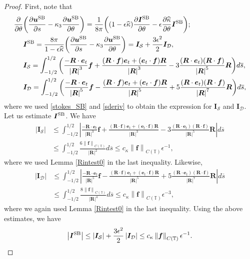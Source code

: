 \documentclass[11pt]{article}
\numberwithin{equation}{section}
\newcommand{\T}{\mathbb{T}}
\newcommand{\bars}{\overline s}
\newcommand{\bu}{\bm{u}}
\newcommand{\be}{\bm{e}}
\newcommand{\p}{\partial}
\newcommand{\SB}{{\rm SB}}
\newcommand{\abs}[1]{\left\lvert #1 \right\rvert}
\newcommand{\norm}[1]{\left\lVert #1 \right\rVert}
\newcommand{\wh}[1]{\widehat{#1}}
\newcommand{\mc}[1]{\mathcal{#1}}
\theoremstyle{definition}
\begin{document}
\begin{proof}
First, note that 
\begin{equation}\label{uSBstheta}
\begin{split}
\frac{\p}{\p\theta}&\bigg(\frac{\p\bu^{\SB}}{\p s}-\kappa_3\frac{\p\bu^{\SB}}{\p\theta}\bigg) = \frac{1}{8\pi}\bigg((1-\epsilon\wh\kappa)\frac{\p \bm{I}^{\SB}}{\p \theta} - \epsilon\frac{\p \wh{\kappa}}{\p \theta}\bm{I}^{\SB} \bigg);\\
&\bm{I}^{\SB}=\frac{8\pi}{1-\epsilon\wh{\kappa}}\bigg(\frac{\p \bu^{\SB}}{\p s} -\kappa_3\frac{\p\bu^{\SB}}{\p \theta}\bigg) = \bm{I}_{\mc{S}}+\frac{3\epsilon^2}{2}\bm{I}_{\mc{D}},\\
&\bm{I}_{\mc{S}}=\int_{-1/2}^{1/2}\bigg(\frac{-\bm{R}\cdot\be_t}{\abs{\bm{R}}^3}\bm{f} + \frac{(\bm{R}\cdot \bm{f})\be_t +(\be_t\cdot \bm{f})\bm{R}}{\abs{\bm{R}}^3} - 3\frac{(\bm{R}\cdot\be_t)(\bm{R}\cdot\bm{f})}{\abs{\bm{R}}^5}\bm{R} \bigg)d\bars,\\
&\bm{I}_{\mc{D}}= \int_{-1/2}^{1/2}\bigg(\frac{-\bm{R}\cdot\be_t}{\abs{\bm{R}}^5}\bm{f} -\frac{(\bm{R}\cdot \bm{f})\be_t +(\be_t\cdot \bm{f})\bm{R}}{\abs{\bm{R}}^5} +5\frac{(\bm{R}\cdot\be_t)(\bm{R}\cdot\bm{f})}{\abs{\bm{R}}^7}\bm{R} \bigg)d\bars,
\end{split}
\end{equation}
where we used \eqref{stokes_SB} and \eqref{sderiv} to obtain the expression for $\bm{I}_{\mc S}$ and $\bm{I}_{\mc D}$.\\

Let us estimate $\bm{I}^{\SB}$. We have
\begin{align*}
\abs{\bm{I}_{\mc{S}}} &\le \int_{-1/2}^{1/2}\abs{\frac{-\bm{R}\cdot\be_t}{\abs{\bm{R}}^3}\bm{f} +\frac{(\bm{R}\cdot \bm{f})\be_t+(\be_t\cdot \bm{f})\bm{R}}{\abs{\bm{R}}^3} - 3\frac{(\bm{R}\cdot\be_t)(\bm{R}\cdot\bm{f})}{\abs{\bm{R}}^5}\bm{R}} d\bars \\
&\le \int_{-1/2}^{1/2} \frac{6\norm{\bm{f}}_{C(\T)}}{\abs{\bm{R}}^2}d\bars
\le c_\kappa \norm{\bm{f}}_{C(\T)}\epsilon^{-1},
\end{align*}
where we used Lemma \ref{Rintest0} in the last inequality. Likewise,
\begin{align*}
\abs{\bm{I}_{\mc{D}}} &\le \int_{-1/2}^{1/2}\abs{\frac{-\bm{R}\cdot\be_t}{\abs{\bm{R}}^5}\bm{f} -\frac{(\bm{R}\cdot \bm{f})\be_t +(\be_t\cdot \bm{f})\bm{R}}{\abs{\bm{R}}^5} +5\frac{(\bm{R}\cdot\be_t)(\bm{R}\cdot\bm{f})}{\abs{\bm{R}}^7}\bm{R}} d\bars \\
&\le \int_{-1/2}^{1/2} \frac{8\norm{\bm{f}}_{C(\T)}}{\abs{\bm{R}}^4}d\bars \le c_\kappa \norm{\bm{f}}_{C(\T)}\epsilon^{-3},
\end{align*}
where we again used Lemma \ref{Rintest0} in the last inequality. Using the above estimates, we have
\begin{equation}\label{CI}
\abs{\bm{I}^{\SB}} \le \abs{\bm{I}_{\mc S}}+\frac{3\epsilon^2}{2}\abs{\bm{I}_{\mc D}}
\le c_\kappa\norm{\bm{f}}_{C(\T)}\epsilon^{-1}.
\end{equation}


\end{proof}
\end{document}
